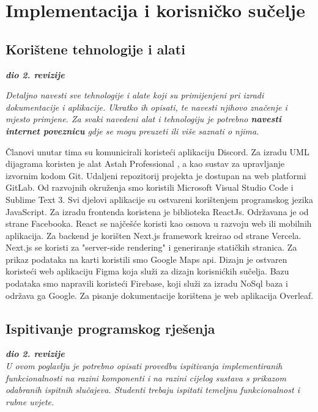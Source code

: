 \chapter{Implementacija i korisničko sučelje}
		
		
		\section{Korištene tehnologije i alati}
		
			\textbf{\textit{dio 2. revizije}}
			
			 \textit{Detaljno navesti sve tehnologije i alate koji su primijenjeni pri izradi dokumentacije i aplikacije. Ukratko ih opisati, te navesti njihovo značenje i mjesto primjene. Za svaki navedeni alat i tehnologiju je potrebno \textbf{navesti internet poveznicu} gdje se mogu preuzeti ili više saznati o njima}.
			
			
			\eject 
			Članovi unutar tima su komunicirali koristeći aplikaciju Discord. 
			Za izradu UML dijagrama koristen je alat Astah Professional
			, a kao sustav za upravljanje
			izvornim kodom Git. Udaljeni repozitorij projekta je dostupan na web platformi
			GitLab. Od razvojnih okruženja smo koristili Microsoft Visual Studio Code i Sublime Text 3. Svi djelovi aplikacije su ostvareni korištenjem programskog jezika JavaScript. Za izradu frontenda koristena je biblioteka ReactJs. Održavana je od strane Facebooka. React se najčešće koristi kao osnova  u razvoju web ili mobilnih aplikacija. Za backend je korišten Next.js framework kreirao od strane Vercela. Next.js se koristi za "server-side rendering" i generiranje statičkih stranica. Za prikaz podataka na karti koristili smo Google Maps api. Dizajn je ostvaren koristeći web aplikaciju Figma koja služi za dizajn korisnićkih sučelja. Bazu podataka smo napravili koristeći Firebase, koji služi za izradu NoSql baza i održava ga Google. Za pisanje dokumentacije korištena je web aplikacija Overleaf.
			
	
		\section{Ispitivanje programskog rješenja}
			
			\textbf{\textit{dio 2. revizije}}\\
			
			 \textit{U ovom poglavlju je potrebno opisati provedbu ispitivanja implementiranih funkcionalnosti na razini komponenti i na razini cijelog sustava s prikazom odabranih ispitnih slučajeva. Studenti trebaju ispitati temeljnu funkcionalnost i rubne uvjete.}
	
